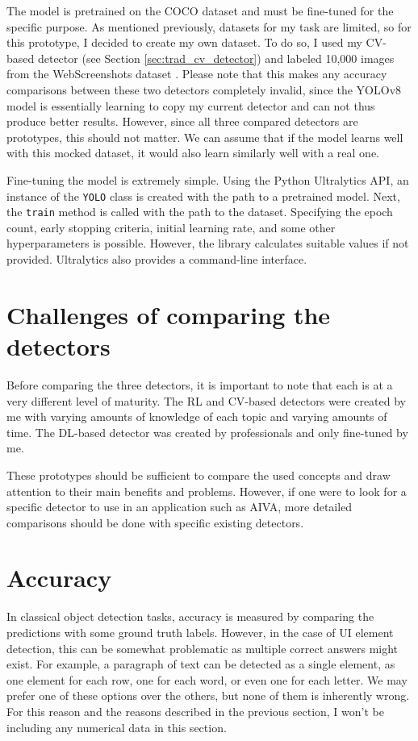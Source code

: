 \documentclass[
  digital,     %
  oneside,     %
  nosansbold,  %
  nocolorbold, %
  lof,         %
  lot,         %
]{fithesis4}
\begin{document}
The model is pretrained on the COCO dataset \cite{COCO} and must be fine-tuned for the specific purpose. As mentioned previously, datasets for my task are limited, so for this prototype, I decided to create my own dataset. To do so, I used my CV-based detector (see Section \ref{sec:trad_cv_detector}) and labeled 10,000 images from the WebScreenshots dataset \cite{aydos2020}. Please note that this makes any accuracy comparisons between these two detectors completely invalid, since the YOLOv8 model is essentially learning to copy my current detector and can not thus produce better results. However, since all three compared detectors are prototypes, this should not matter. We can assume that if the model learns well with this mocked dataset, it would also learn similarly well with a real one.

Fine-tuning the model is extremely simple. Using the Python Ultralytics API, an instance of the \texttt{YOLO} class is created with the path to a pretrained model. Next, the \texttt{train} method is called with the path to the dataset. Specifying the epoch count, early stopping criteria, initial learning rate, and some other hyperparameters is possible. However, the library calculates suitable values if not provided. Ultralytics also provides a command-line interface.

\section{Challenges of comparing the detectors}

Before comparing the three detectors, it is important to note that each is at a very different level of maturity. The RL and CV-based detectors were created by me with varying amounts of knowledge of each topic and varying amounts of time. The DL-based detector was created by professionals and only fine-tuned by me.

These prototypes should be sufficient to compare the used concepts and draw attention to their main benefits and problems. However, if one were to look for a specific detector to use in an application such as AIVA, more detailed comparisons should be done with specific existing detectors.

\section{Accuracy}

In classical object detection tasks, accuracy is measured by comparing the predictions with some ground truth labels. However, in the case of UI element detection, this can be somewhat problematic as multiple correct answers might exist. For example, a paragraph of text can be detected as a single element, as one element for each row, one for each word, or even one for each letter. We may prefer one of these options over the others, but none of them is inherently wrong. For this reason and the reasons described in the previous section, I won't be including any numerical data in this section.
\end{document}
